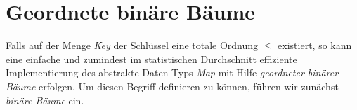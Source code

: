 
    
    
    
    
    
        


\section{Geordnete bin\"are B\"aume}
Falls auf der Menge \textsl{Key} der Schl\"ussel eine totale Ordnung $\leq$ existiert, so kann
eine einfache und zumindest im statistischen Durchschnitt effiziente Implementierung des
abstrakte Daten-Typs \textsl{Map} mit Hilfe \emph{geordneter bin\"arer B\"aume} erfolgen.
Um diesen Begriff definieren zu k\"onnen, f\"uhren wir zun\"achst \emph{bin\"are B\"aume} ein.

